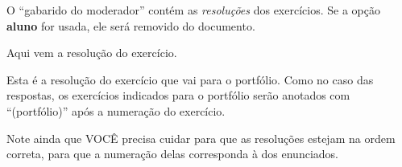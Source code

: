 \documentclass[a4paper]{article}
\newcommand\code[1]{\textbf{#1}}
\begin{document}
  \begin{resolucoes}

    O ``gabarido do moderador'' contém as \emph{resoluções} dos exercícios.
    Se a opção \code{aluno} for usada, ele será removido do documento.

    \begin{exercicio}
      Aqui vem a resolução do exercício.
    \end{exercicio}
    
  
  
    \begin{exercicio*}
      Esta é a resolução do exercício que vai para o portfólio.
      Como no caso das respostas, os exercícios indicados para o portfólio serão anotados com ``(portfólio)'' após a numeração do exercício.
    \end{exercicio*}

  
  
    \begin{exercicio}
      Note ainda que VOCÊ precisa cuidar para que as resoluções estejam na ordem correta,
      para que a numeração delas corresponda à dos enunciados.
    \end{exercicio}

  \end{resolucoes}
  
  
  
  
  
  
  
  
  
\end{document}
